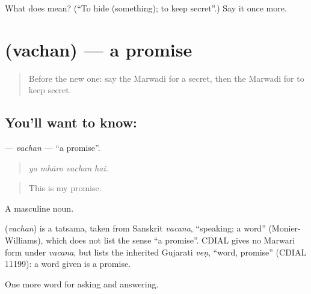 \begin{tcolorbox}[breakable,colback=teal!4,colframe=teal!35!black,title={Before you move on}]
What does  mean? (\textquotedblleft{}To hide (something); to keep secret\textquotedblright{}.) Say it once more.
\end{tcolorbox}
\section[\texorpdfstring{\mw{वचन} (vachan)}{वचन (vachan)}]{ (vachan) — a promise}

\label{lesson:MW-C273-vachan}



\begin{quote}
Before the new one: say the Marwadi for a secret, then the Marwadi for to keep secret.
\end{quote}

\subsection*{You'll want to know: }
\textbf{} — \emph{vachan} — \textquotedblleft{}a promise\textquotedblright{}.

\begin{quote}
   
\end{quote}

\begin{quote}
\emph{yo mhāro vachan hai.}
\end{quote}

\begin{quote}
This is my promise.
\end{quote}

A masculine noun.

\begin{cousinweb}
\textbf{} (\emph{vachan}) is a tatsama, taken from Sanskrit \emph{vacana}, \textquotedblleft{}speaking; a word\textquotedblright{} (Monier-Williams), which does not list the sense \textquotedblleft{}a promise\textquotedblright{}. CDIAL gives no Marwari form under \emph{vacana}, but lists the inherited Gujarati \emph{veṇ}, \textquotedblleft{}word, promise\textquotedblright{} (CDIAL 11199): a word given is a promise.
\end{cousinweb}

\begin{grammarlens}[title={What you've built}]
One more word for asking and answering.
\end{grammarlens}


